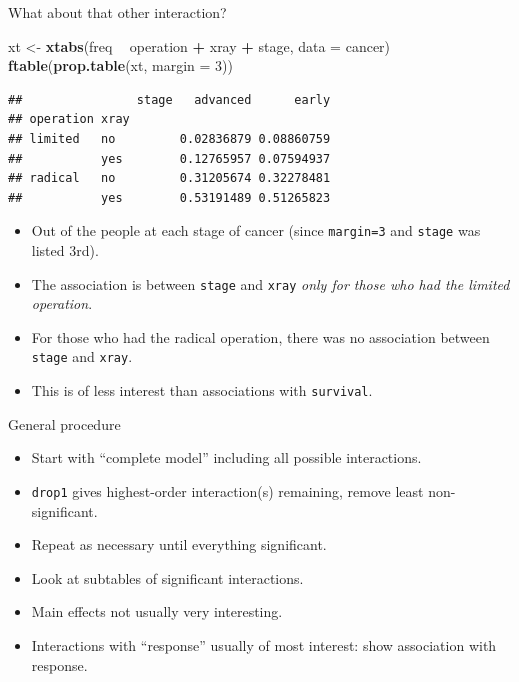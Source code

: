 \documentclass[ignorenonframetext,]{beamer}
\newenvironment{Shaded}{\begin{snugshade}}{\end{snugshade}}
\newcommand{\DataTypeTok}[1]{\textcolor[rgb]{0.13,0.29,0.53}{#1}}
\newcommand{\DecValTok}[1]{\textcolor[rgb]{0.00,0.00,0.81}{#1}}
\newcommand{\KeywordTok}[1]{\textcolor[rgb]{0.13,0.29,0.53}{\textbf{#1}}}
\newcommand{\NormalTok}[1]{#1}
\newcommand{\OperatorTok}[1]{\textcolor[rgb]{0.81,0.36,0.00}{\textbf{#1}}}
\newcommand{\StringTok}[1]{\textcolor[rgb]{0.31,0.60,0.02}{#1}}
\begin{document}
\begin{frame}[fragile]{What about that other interaction?}
\protect\hypertarget{what-about-that-other-interaction}{}

\footnotesize

\begin{Shaded}
\begin{Highlighting}[]
\NormalTok{xt <-}\StringTok{ }\KeywordTok{xtabs}\NormalTok{(freq }\OperatorTok{~}\StringTok{ }\NormalTok{operation }\OperatorTok{+}\StringTok{ }\NormalTok{xray }\OperatorTok{+}\StringTok{ }\NormalTok{stage, }\DataTypeTok{data =}\NormalTok{ cancer)}
\KeywordTok{ftable}\NormalTok{(}\KeywordTok{prop.table}\NormalTok{(xt, }\DataTypeTok{margin =} \DecValTok{3}\NormalTok{))}
\end{Highlighting}
\end{Shaded}

\begin{verbatim}
##                stage   advanced      early
## operation xray                            
## limited   no         0.02836879 0.08860759
##           yes        0.12765957 0.07594937
## radical   no         0.31205674 0.32278481
##           yes        0.53191489 0.51265823
\end{verbatim}

\normalsize

\begin{itemize}
\item
  Out of the people at each stage of cancer (since \texttt{margin=3} and
  \texttt{stage} was listed 3rd).
\item
  The association is between \texttt{stage} and \texttt{xray} \emph{only
  for those who had the limited operation}.
\item
  For those who had the radical operation, there was no association
  between \texttt{stage} and \texttt{xray}.
\item
  This is of less interest than associations with \texttt{survival}.
\end{itemize}

\end{frame}

\begin{frame}[fragile]{General procedure}
\protect\hypertarget{general-procedure}{}

\begin{itemize}
\item
  Start with ``complete model'' including all possible interactions.
\item
  \texttt{drop1} gives highest-order interaction(s) remaining, remove
  least non-significant.
\item
  Repeat as necessary until everything significant.
\item
  Look at subtables of significant interactions.
\item
  Main effects not usually very interesting.
\item
  Interactions with ``response'' usually of most interest: show
  association with response.
\end{itemize}

\end{frame}
\end{document}
